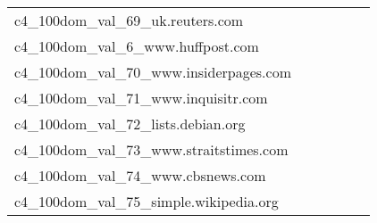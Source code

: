 {\begin{longtable}{m{6cm}m{1.7cm}m{1.7cm}m{1.7cm}m{1.7cm}m{1.7cm}}
	c4\_100dom\_val\_69\_uk.reuters.com  & \colorbox[HTML]{ffffe5}{\makebox[\mywidth][c]{9.54}} & \colorbox[HTML]{f1f9b4}{\makebox[\mywidth][c]{9.13}} & \colorbox[HTML]{ffffe5}{\makebox[\mywidth][c]{9.90}} & \colorbox[HTML]{dff2a7}{\makebox[\mywidth][c]{9.07}} & \colorbox[HTML]{77c578}{\makebox[\mywidth][c]{8.92}}\\
	c4\_100dom\_val\_6\_www.huffpost.com  & \colorbox[HTML]{fefee2}{\makebox[\mywidth][c]{13.45}} & \colorbox[HTML]{e7f5ad}{\makebox[\mywidth][c]{13.03}} & \colorbox[HTML]{ffffe5}{\makebox[\mywidth][c]{13.96}} & \colorbox[HTML]{dcf1a5}{\makebox[\mywidth][c]{12.99}} & \colorbox[HTML]{77c578}{\makebox[\mywidth][c]{12.83}}\\
	c4\_100dom\_val\_70\_www.insiderpages.com  & \colorbox[HTML]{ffffe5}{\makebox[\mywidth][c]{13.24}} & \colorbox[HTML]{f3fab6}{\makebox[\mywidth][c]{12.84}} & \colorbox[HTML]{ffffe5}{\makebox[\mywidth][c]{13.55}} & \colorbox[HTML]{ddf1a6}{\makebox[\mywidth][c]{12.77}} & \colorbox[HTML]{77c578}{\makebox[\mywidth][c]{12.64}}\\
	c4\_100dom\_val\_71\_www.inquisitr.com  & \colorbox[HTML]{fefee0}{\makebox[\mywidth][c]{12.12}} & \colorbox[HTML]{daf0a4}{\makebox[\mywidth][c]{11.58}} & \colorbox[HTML]{ffffe5}{\makebox[\mywidth][c]{12.86}} & \colorbox[HTML]{f3fab6}{\makebox[\mywidth][c]{11.71}} & \colorbox[HTML]{77c578}{\makebox[\mywidth][c]{11.38}}\\
	c4\_100dom\_val\_72\_lists.debian.org  & \colorbox[HTML]{fcfdd5}{\makebox[\mywidth][c]{18.18}} & \colorbox[HTML]{f2fab5}{\makebox[\mywidth][c]{17.81}} & \colorbox[HTML]{ffffe5}{\makebox[\mywidth][c]{19.62}} & \colorbox[HTML]{e3f4aa}{\makebox[\mywidth][c]{17.67}} & \colorbox[HTML]{77c578}{\makebox[\mywidth][c]{17.30}}\\
	c4\_100dom\_val\_73\_www.straitstimes.com  & \colorbox[HTML]{ffffe5}{\makebox[\mywidth][c]{11.51}} & \colorbox[HTML]{f6fbb8}{\makebox[\mywidth][c]{11.06}} & \colorbox[HTML]{ffffe5}{\makebox[\mywidth][c]{11.91}} & \colorbox[HTML]{daf0a4}{\makebox[\mywidth][c]{10.94}} & \colorbox[HTML]{77c578}{\makebox[\mywidth][c]{10.79}}\\
	c4\_100dom\_val\_74\_www.cbsnews.com  & \colorbox[HTML]{ffffe5}{\makebox[\mywidth][c]{10.29}} & \colorbox[HTML]{f3fab6}{\makebox[\mywidth][c]{9.91}} & \colorbox[HTML]{ffffe5}{\makebox[\mywidth][c]{10.60}} & \colorbox[HTML]{d0ec9e}{\makebox[\mywidth][c]{9.82}} & \colorbox[HTML]{77c578}{\makebox[\mywidth][c]{9.72}}\\
	c4\_100dom\_val\_75\_simple.wikipedia.org  & \colorbox[HTML]{ffffe5}{\makebox[\mywidth][c]{8.25}} & \colorbox[HTML]{f7fcbb}{\makebox[\mywidth][c]{7.85}} & \colorbox[HTML]{ffffe5}{\makebox[\mywidth][c]{8.37}} & \colorbox[HTML]{e0f2a8}{\makebox[\mywidth][c]{7.78}} & \colorbox[HTML]{77c578}{\makebox[\mywidth][c]{7.67}}\\

\end{longtable}}
